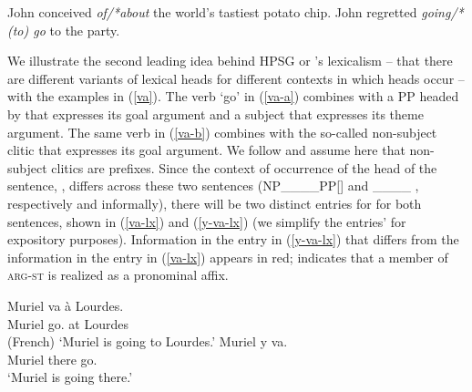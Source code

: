 \documentclass[output=paper
 	        ,biblatex
                ,babelshorthands
                ,newtxmath
                ,draftmode
                ,colorlinks, citecolor=brown
]{langscibook}
\begin{document}
\eal
\label{select}
\ex\label{select-a}John conceived \emph{of/*about} the world's tastiest potato chip.
\ex\label{select-b} John regretted \emph{going/*(to) go} to the party.
\zl


We illustrate the second leading idea behind HPSG or \lfg's lexicalism -- that there are different variants of lexical heads for different contexts in which heads occur -- with the  examples in (\ref{va}). The verb  `go' in (\ref{va-a}) combines with a PP headed by  that expresses its goal argument and a subject that expresses its theme argument. The same verb in (\ref{va-b}) combines with the so-called non-subject clitic  that expresses its goal argument. We follow \citet{MillerandSag1997} and assume here that  non-subject clitics are prefixes. Since the context of occurrence of the head of the sentence, , differs across these two sentences (\textsc{NP\_\_\_\_PP}[] and  \_\_\_\_ , respectively and informally), there will be two distinct entries for  for both sentences, shown in (\ref{va-lx}) and (\ref{y-va-lx}) (we simplify the entries'  for expository purposes). Information in the entry in (\ref{y-va-lx}) that differs from the information in the entry in (\ref{va-lx}) appears in red;  indicates that a member of \textsc{arg-st} is realized as a pronominal affix.

\eal
\label{va}
\ex\label{va-a} 
\gll Muriel va à Lourdes. \\
     Muriel go. at Lourdes \\\hfill(French)
     \glt `Muriel is going to Lourdes.'
\ex\label{va-b}
\gll Muriel y va. \\
     Muriel there go. \\
 \glt `Muriel is going there.'
\zl

\ea
\label{va-lx}
\z
\end{document}
